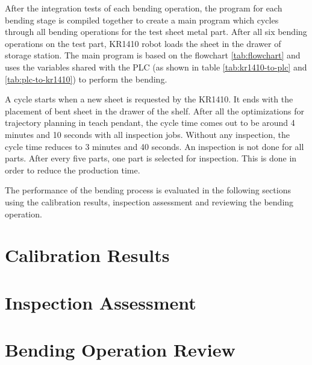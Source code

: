 After the integration tests of each bending operation, the program for each bending stage is compiled together to create a main program which cycles through all bending operations for the test sheet metal part. After all six bending operations on the test part, KR1410 robot loads the sheet in the drawer of storage station.
The main program is based on the flowchart \ref{tab:flowchart} and uses the variables shared with the PLC (as shown in table \ref{tab:kr1410-to-plc} and \ref{tab:plc-to-kr1410}) to perform the bending.

A cycle starts when a new sheet is requested by the KR1410. It ends with the placement of bent sheet in the drawer of the shelf. After all the optimizations for trajectory planning in teach pendant, the cycle time comes out to be around 4 minutes and 10 seconds with all inspection jobs. Without any inspection, the cycle time reduces to 3 minutes and 40 seconds. An inspection is not done for all parts. After every five parts, one part is selected for inspection. This is done in order to reduce the production time.

The performance of the bending process is evaluated in the following sections using the calibration results, inspection assessment and reviewing the bending operation.

\section{Calibration Results}
\label{sec:calibration-results}

\FloatBarrier  %

\section{Inspection Assessment}
\label{sec:inspection-assessment}

\FloatBarrier  %

\section{Bending Operation Review}
\label{sec:calibration-results}

\FloatBarrier  %


